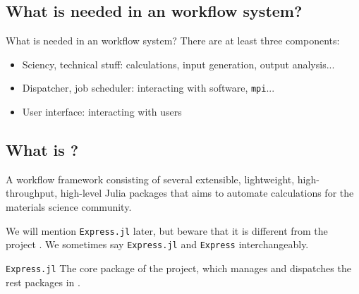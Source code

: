 \subsection{What is needed in an \ab{} workflow system?}

\begin{frame}{What is needed in an \ab{} workflow system?}
    There are at least three components:

    \begin{itemize}
        \item Sciency, technical stuff: calculations, input generation, output analysis...
        \item Dispatcher, job scheduler: interacting with \ab{} software, \texttt{mpi}...
        \item User interface: interacting with users
    \end{itemize}
\end{frame}

\subsection{What is \express{}?}

\begin{frame}{\subsecname}
    \begin{definitionblock}{\express{}}
        A workflow framework consisting of several extensible, lightweight, high-throughput,
        high-level Julia packages that aims to automate \ab{} calculations for the materials
        science community.
    \end{definitionblock}

    We will mention \texttt{Express.jl} later, but beware that it is different from the
    project \express{}. We sometimes say \texttt{Express.jl} and \texttt{Express}
    interchangeably.

    \begin{definitionblock}{\texttt{Express.jl}}
        The core package of the \express{} project, which manages and dispatches the rest
        packages in \express{}.
    \end{definitionblock}
\end{frame}


